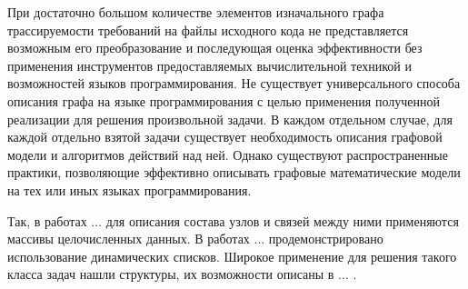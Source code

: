 При достаточно большом количестве элементов изначального графа трассируемости требований на файлы исходного кода не представляется возможным его преобразование и последующая оценка эффективности без применения инструментов предоставляемых вычислительной техникой и возможностей языков программирования. Не существует универсального способа описания графа на языке программирования с целью применения полученной реализации для решения произвольной задачи. В каждом отдельном случае, для каждой отдельно взятой задачи существует необходимость описания графовой модели и алгоритмов действий над ней. Однако существуют распространенные практики, позволяющие эффективно описывать графовые математические модели на тех или иных языках программирования.


Так, в работах ... для описания состава узлов и связей между ними применяются массивы целочисленных данных. В работах ... продемонстрировано использование динамических списков. Широкое применение для решения такого класса задач нашли структуры, их возможности описаны в ... .